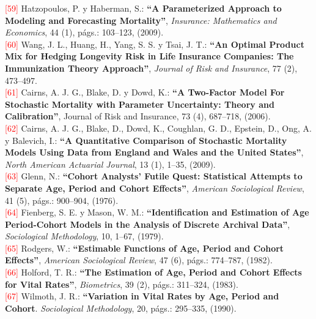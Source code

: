 \noindent \textcolor{red}{[59]} Hatzopoulos, P. y Haberman, S.: \textbf{``A Parameterized Approach to Modeling and Forecasting Mortality''}, \textit{Insurance: Mathematics and Economics}, 44 (1), págs.: 103–123, (2009).\\

\noindent \textcolor{red}{[60]} Wang, J. L., Huang, H., Yang, S. S. y Tsai, J. T.: \textbf{ ``An Optimal Product Mix for Hedging Longevity Risk in Life Insurance Companies: The Immunization Theory Approach''}, \textit{Journal of Risk and Insurance}, 77 (2), 473–497.\\

\noindent \textcolor{red}{[61]} Cairns, A. J. G., Blake, D. y Dowd, K.: \textbf{``A Two-Factor Model For Stochastic Mortality with Parameter Uncertainty: Theory and Calibration''}, Journal of Risk and Insurance, 73 (4), 687–718, (2006).\\

\noindent \textcolor{red}{[62]} Cairns, A. J. G., Blake, D., Dowd, K., Coughlan, G. D., Epstein, D., Ong, A. y Balevich, I.: \textbf{``A Quantitative Comparison of Stochastic Mortality Models Using Data from England and Wales and the United States''}, \textit{North American Actuarial Journal}, 13 (1), 1–35, (2009).\\

\noindent \textcolor{red}{[63]} Glenn, N.: \textbf{``Cohort Analysts’ Futile Quest: Statistical Attempts to Separate Age, Period and Cohort Effects''}, \textit{American Sociological Review}, 41 (5), págs.: 900–904, (1976).\\

\noindent \textcolor{red}{[64]} Fienberg, S. E. y Mason, W. M.: \textbf{``Identification and Estimation of Age Period-Cohort Models in the Analysis of Discrete Archival Data''}, \textit{Sociological Methodology}, 10, 1–67, (1979).\\

\noindent \textcolor{red}{[65]} Rodgers, W.: \textbf{``Estimable Functions of Age, Period and Cohort Effects''}, \textit{American Sociological Review}, 47 (6), págs.: 774–787, (1982).\\

\noindent \textcolor{red}{[66]} Holford, T. R.: \textbf{``The Estimation of Age, Period and Cohort Effects for Vital Rates''}, \textit{Biometrics}, 39 (2), págs.: 311–324, (1983).\\

\noindent \textcolor{red}{[67]} Wilmoth, J. R.: \textbf{``Variation in Vital Rates by Age, Period and Cohort}. \textit{Sociological Methodology}, 20, págs.: 295–335, (1990).\\

